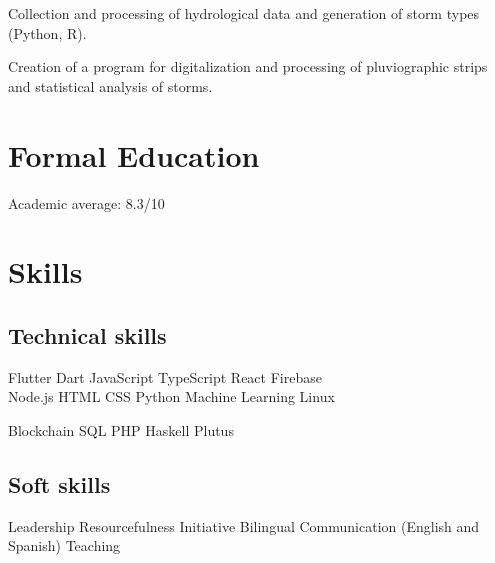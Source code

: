 \documentclass[]{deedy-resume-openfont}
\begin{document}
\begin{minipage}[t]{0.48\textwidth}
\begin{tightemize}
\item Collection and processing of hydrological data and generation of storm types (Python, R).
\item Creation of a program for digitalization and processing of pluviographic strips and statistical analysis of storms.
\end{tightemize}
\sectionsep



\section{Formal Education}

\begin{tightemize}
\item Academic average: 8.3/10
\end{tightemize}
\sectionsep

\sectionsep



\section{Skills}
\subsection{Technical skills}
Flutter \textbullet{}
Dart \textbullet{}
JavaScript \textbullet{}
TypeScript \textbullet{}
React \textbullet{}
Firebase \textbullet{} \\
Node.js \textbullet{}
HTML \textbullet{}
CSS \textbullet{}
Python \textbullet{}
Machine Learning \textbullet{}
Linux

Blockchain \textbullet{}
SQL\textbullet{}
PHP \textbullet{}
Haskell \textbullet{}
Plutus
\sectionsep

\subsection{Soft skills}
Leadership \textbullet{}
Resourcefulness \textbullet{}
Initiative \textbullet{}
Bilingual Communication (English and Spanish) \textbullet{}
Teaching

%
%

\end{minipage} 
\end{document}
